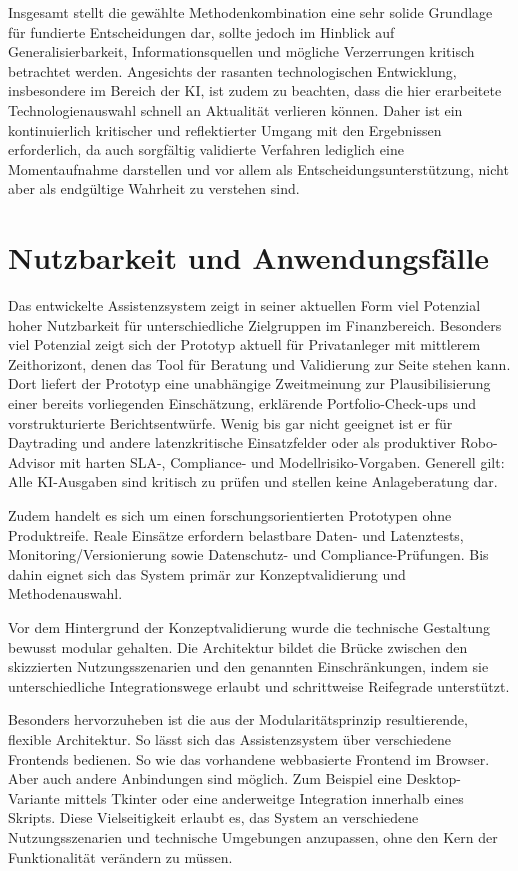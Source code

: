     Insgesamt stellt die gewählte Methodenkombination eine sehr solide Grundlage für fundierte Entscheidungen dar, sollte jedoch im Hinblick auf Generalisierbarkeit, Informationsquellen und mögliche Verzerrungen kritisch betrachtet werden.
    Angesichts der rasanten technologischen Entwicklung, insbesondere im Bereich der \acs{KI}, ist zudem zu beachten, dass die hier erarbeitete Technologienauswahl schnell an Aktualität verlieren können.
    Daher ist ein kontinuierlich kritischer und reflektierter Umgang mit den Ergebnissen erforderlich, da auch sorgfältig validierte Verfahren lediglich eine Momentaufnahme darstellen und vor allem als Entscheidungsunterstützung, nicht aber als endgültige Wahrheit zu verstehen sind.

  \section{Nutzbarkeit und Anwendungsfälle}

    Das entwickelte Assistenzsystem zeigt in seiner aktuellen Form viel Potenzial hoher Nutzbarkeit für unterschiedliche Zielgruppen im Finanzbereich.
    Besonders viel Potenzial zeigt sich der Prototyp aktuell für Privatanleger mit mittlerem Zeithorizont, denen das Tool für Beratung und Validierung zur Seite stehen kann.
    Dort liefert der Prototyp eine unabhängige Zweitmeinung zur Plausibilisierung einer bereits vorliegenden Einschätzung, erklärende Portfolio-Check-ups und vorstrukturierte Berichtsentwürfe.
    Wenig bis gar nicht geeignet ist er für Daytrading und andere latenzkritische Einsatzfelder oder als produktiver Robo-Advisor mit harten SLA-, Compliance- und Modellrisiko-Vorgaben.
    Generell gilt: Alle \acs{KI}-Ausgaben sind kritisch zu prüfen und stellen keine Anlageberatung dar.

    Zudem handelt es sich um einen forschungsorientierten Prototypen ohne Produktreife.
    Reale Einsätze erfordern belastbare Daten- und Latenztests, Monitoring/Versionierung sowie Datenschutz- und Compliance-Prüfungen.
    Bis dahin eignet sich das System primär zur Konzeptvalidierung und Methodenauswahl.

    Vor dem Hintergrund der Konzeptvalidierung wurde die technische Gestaltung bewusst modular gehalten.
    Die Architektur bildet die Brücke zwischen den skizzierten Nutzungsszenarien und den genannten Einschränkungen, indem sie unterschiedliche Integrationswege erlaubt und schrittweise Reifegrade unterstützt.

    Besonders hervorzuheben ist die aus der Modularitätsprinzip resultierende, flexible Architektur.
    So lässt sich das Assistenzsystem über verschiedene Frontends bedienen.
    So wie das vorhandene webbasierte Frontend im Browser.
    Aber auch andere Anbindungen sind möglich.
    Zum Beispiel eine Desktop-Variante mittels Tkinter oder eine anderweitge Integration innerhalb eines Skripts.
    Diese Vielseitigkeit erlaubt es, das System an verschiedene Nutzungsszenarien und technische Umgebungen anzupassen, ohne den Kern der Funktionalität verändern zu müssen.

